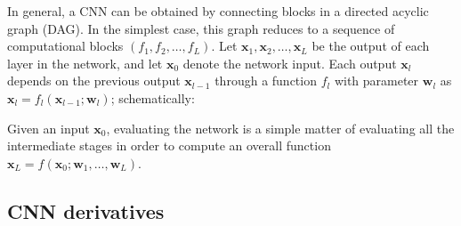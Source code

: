 \documentclass[12pt]{article}
\newcommand{\bx}{\mathbf{x}}
\newcommand{\bw}{\mathbf{w}}
\begin{document}
In general, a CNN can be obtained by connecting blocks in a directed acyclic graph (DAG). In the simplest case, this graph reduces to a sequence of computational blocks $(f_1,f_2,\dots,f_L)$. Let $\bx_1,\bx_2,\dots,\bx_L$ be the output of each layer in the network, and let $\bx_0$ denote the network input. Each output $\bx_l$ depends on the previous output $\bx_{l-1}$ through a function $f_l$ with parameter $\bw_l$ as $\bx_l = f_l(\bx_{l-1};\bw_l)$; schematically:
\begin{center}
\end{center}
Given an input $\bx_0$, evaluating the network is a simple matter of evaluating all the intermediate stages in order to compute an overall function $\bx_L = f(\bx_0;\bw_1,\dots,\bw_L)$. 

\subsection{CNN derivatives}\label{s:backward}
\end{document}
